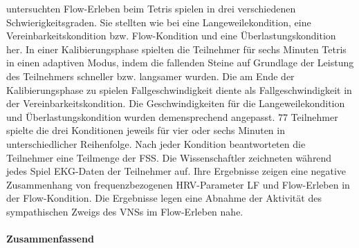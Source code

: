 untersuchten Flow-Erleben beim Tetris spielen in drei verschiedenen Schwierigkeitsgraden. Sie stellten wie bei \citet{Keller2011, Tozman2015} eine Langeweilekondition, eine Vereinbarkeitskondition bzw. Flow-Kondition und eine Überlastungskondition her. In einer Kalibierungsphase spielten die Teilnehmer für sechs Minuten Tetris in einen adaptiven Modus, indem die fallenden Steine auf Grundlage der Leistung des Teilnehmers schneller bzw. langsamer wurden. Die am Ende der Kalibierungsphase zu spielen Fallgeschwindigkeit diente als Fallgeschwindigkeit in der Vereinbarkeitskondition. Die Geschwindigkeiten für die Langeweilekondition und Überlastungskondition wurden demensprechend angepasst. 77 Teilnehmer spielte die drei Konditionen jeweils für vier oder sechs Minuten in unterschiedlicher Reihenfolge. Nach jeder Kondition beantworteten die Teilnehmer eine Teilmenge der \ac{FSS}. Die Wissenschaftler zeichneten während jedes Spiel \ac{EKG}-Daten der Teilnehmer auf. Ihre Ergebnisse zeigen eine negative Zusammenhang von frequenzbezogenen \ac{HRV}-Parameter \acs{LF} und Flow-Erleben in der Flow-Kondition. Die Ergebnisse legen eine Abnahme der Aktivität des sympathischen Zweigs des \acs{VNS}s im Flow-Erleben nahe.

\paragraph{Zusammenfassend} 

